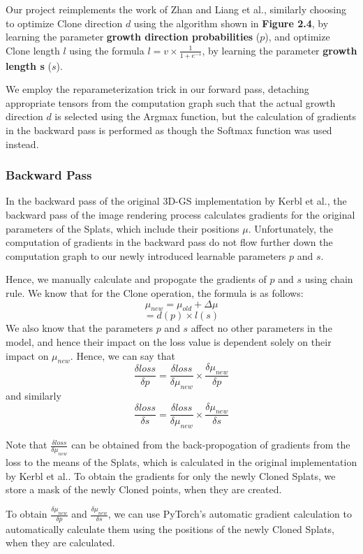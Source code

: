 \documentclass[11pt]{report}
\begin{document}
Our project reimplements the work of Zhan and Liang et al., similarly choosing to optimize Clone direction $d$ using the algorithm shown in \textbf{Figure 2.4}, by learning the parameter \textbf{growth direction probabilities} ($p$), and optimize Clone length $l$ using the formula $l = v \times \frac{1}{1 + e^{-s}}$, by learning the parameter \textbf{growth length s} ($s$).

We employ the reparameterization trick in our forward pass, detaching appropriate tensors from the computation graph such that the actual growth direction $d$ is selected using the Argmax function, but the calculation of gradients in the backward pass is performed as though the Softmax function was used instead.

\subsubsection{Backward Pass}
In the backward pass of the original 3D-GS implementation by Kerbl et al., the backward pass of the image rendering process calculates gradients for the original parameters of the Splats, which include their positions $\mu$. Unfortunately, the computation of gradients in the backward pass do not flow further down the computation graph to our newly introduced learnable parameters $p$ and $s$.

Hence, we manually calculate and propogate the gradients of $p$ and $s$ using chain rule. We know that for the Clone operation, the formula is as follows:
\[ \mu_{new} = \mu_{old} + \Delta \mu  \]
\[ = d(p) \times l(s) \]
We also know that the parameters $p$ and $s$ affect no other parameters in the model, and hence their impact on the loss value is dependent solely on their impact on $\mu_{new}$. Hence, we can say that
\[ \frac{\delta loss}{\delta p} = \frac{\delta loss}{\delta \mu_{new}} \times \frac{\delta \mu_{new}}{\delta p} \]
and similarly
\[ \frac{\delta loss}{\delta s} = \frac{\delta loss}{\delta \mu_{new}} \times \frac{\delta \mu_{new}}{\delta s} \]

Note that $\frac{\delta loss}{\delta \mu_{new}}$ can be obtained from the back-propogation of gradients from the loss to the means of the Splats, which is calculated in the original implementation by Kerbl et al.. To obtain the gradients for only the newly Cloned Splats, we store a mask of the newly Cloned points, when they are created.

To obtain $\frac{\delta \mu_{new}}{\delta p}$ and $\frac{\delta \mu_{new}}{\delta s}$, we can use PyTorch's automatic gradient calculation to automatically calculate them using the positions of the newly Cloned Splats, when they are calculated.
\end{document}
